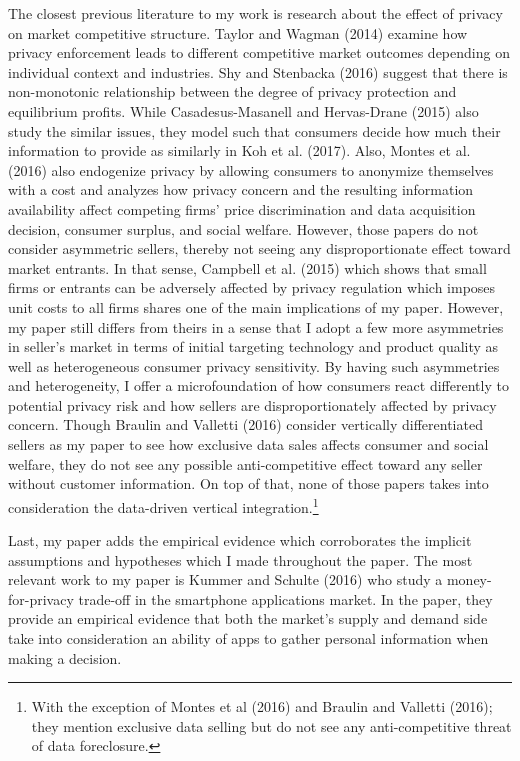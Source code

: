 \documentclass[12pt]{article}
\begin{document}
The closest previous literature to my work is research about the effect of privacy on market competitive structure. Taylor and Wagman (2014) examine how privacy enforcement leads to different competitive market outcomes depending on individual context and industries. Shy and Stenbacka (2016) suggest that there is non-monotonic relationship between the degree of privacy protection and equilibrium profits. While Casadesus-Masanell and Hervas-Drane (2015) also study the similar issues, they model such that consumers decide how much their information to provide as similarly in Koh et al. (2017). Also, Montes et al. (2016) also endogenize privacy by allowing consumers to anonymize themselves with a cost and analyzes how privacy concern and the resulting information availability affect competing firms' price discrimination and data acquisition decision, consumer surplus, and social welfare. However, those papers do not consider asymmetric sellers, thereby not seeing any disproportionate effect toward market entrants. In that sense, Campbell et al. (2015) which shows that small firms or entrants can be adversely affected by privacy regulation which imposes unit costs to all firms shares one of the main implications of my paper. However, my paper still differs from theirs in a sense that I adopt a few more asymmetries in seller's market in terms of initial targeting technology and product quality as well as heterogeneous consumer privacy sensitivity. By having such asymmetries and heterogeneity, I offer a microfoundation of how consumers react differently to potential privacy risk and how sellers are disproportionately affected by privacy concern. Though Braulin and Valletti (2016) consider vertically differentiated sellers as my paper to see how exclusive data sales affects consumer and social welfare, they do not see any possible anti-competitive effect toward any seller without customer information. On top of that, none of those papers takes into consideration the data-driven vertical integration.\footnote{With the exception of Montes et al (2016) and Braulin and Valletti (2016); they mention exclusive data selling but do not see any anti-competitive threat of data foreclosure.} 


Last, my paper adds the empirical evidence which corroborates the implicit assumptions and hypotheses which I made throughout the paper. The most relevant work to my paper is Kummer and Schulte (2016) who study a money-for-privacy trade-off in the smartphone applications market. In the paper, they provide an empirical evidence that both the market's supply and demand side take into consideration an ability of apps to gather personal information when making a decision.
\end{document}
